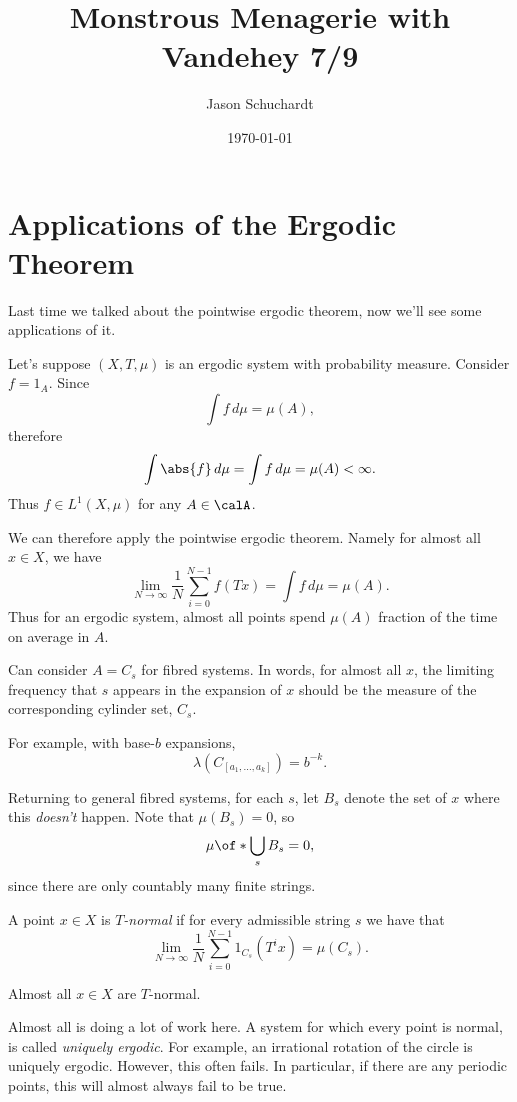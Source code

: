 \documentclass{article}
\title{Monstrous Menagerie with Vandehey 7/9}
\author{Jason Schuchardt}
\date{\today}
\begin{document}
\maketitle

\section{Applications of the Ergodic Theorem}

Last time we talked about the pointwise ergodic theorem, now 
we'll see some applications of it.

Let's suppose $(X,T,\mu)$ is an ergodic system with probability
measure.
Consider $f=1_A$.
Since 
\[ \int f\,d\mu = \mu(A), \]
therefore
\[\int \abs{f}\, d\mu = \int f \, d\mu = \mu(A)<\infty.\]
Thus $f\in L^1(X,\mu)$ for any $A\in\calA$.

We can therefore apply the pointwise ergodic theorem.
Namely for almost all $x\in X$, we have 
\[\lim_{N\to\infty} \frac{1}{N} \sum_{i=0}^{N-1} f(Tx) 
=\int f\, d\mu = \mu(A).\]
Thus for an ergodic system, almost all points spend $\mu(A)$ 
fraction of the time on average in $A$.

Can consider $A=C_s$ for fibred systems. In words, for almost all
$x$, the limiting frequency that $s$ appears in the expansion 
of $x$ should be the measure of the corresponding cylinder 
set, $C_s$.

\begin{example}
    For example, with base-$b$ expansions, 
    \[\lambda(C_{[a_1,\ldots,a_k]}) = b^{-k}. \]
\end{example}

Returning to general fibred systems,
for each $s$, let $B_s$ denote the set of $x$ where this 
\emph{doesn't} happen.
Note that $\mu(B_s)=0$, so 
\[\mu\of*{\bigcup_{s} B_s} = 0,\]
since there are only countably many finite strings.

\begin{definition}
    A point $x\in X$ is \emph{$T$-normal} if for every admissible
    string $s$ we have that 
    \[\lim_{N\to \infty} \frac{1}{N} \sum_{i=0}^{N-1} 1_{C_s}(T^ix)
    = \mu(C_s).\]
\end{definition}

\begin{theorem}
    Almost all $x\in X$ are $T$-normal. 
\end{theorem}

Almost all is doing a lot of work here. A system for which every 
point is normal, is called \emph{uniquely ergodic}. For example,
an irrational rotation of the circle is uniquely ergodic.
However, this often fails. In particular,
if there are any periodic points, this
will almost always fail to be true.
\end{document}
